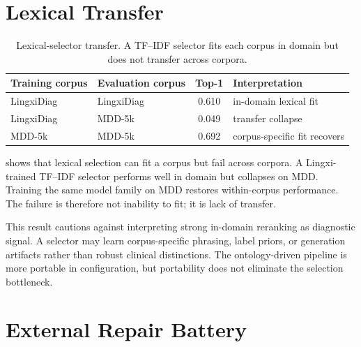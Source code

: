 \section{Lexical Transfer}

\begin{table}[htbp]
\centering
\caption{Lexical-selector transfer. A TF--IDF selector fits each corpus in domain but does not transfer across corpora.}
\label{tab:lexical-transfer-rewrite}
\begin{tabular}{llcl}
\toprule
Training corpus & Evaluation corpus & Top-1 & Interpretation\\
\midrule
LingxiDiag & LingxiDiag & 0.610 & in-domain lexical fit\\
LingxiDiag & MDD-5k & 0.049 & transfer collapse\\
MDD-5k & MDD-5k & 0.692 & corpus-specific fit recovers\\
\bottomrule
\end{tabular}
\end{table}

 shows that lexical selection can fit a corpus but fail across corpora. A Lingxi-trained TF--IDF selector performs well in domain but collapses on MDD. Training the same model family on MDD restores within-corpus performance. The failure is therefore not inability to fit; it is lack of transfer.

This result cautions against interpreting strong in-domain reranking as diagnostic signal. A selector may learn corpus-specific phrasing, label priors, or generation artifacts rather than robust clinical distinctions. The ontology-driven pipeline is more portable in configuration, but portability does not eliminate the selection bottleneck.

\section{External Repair Battery}

